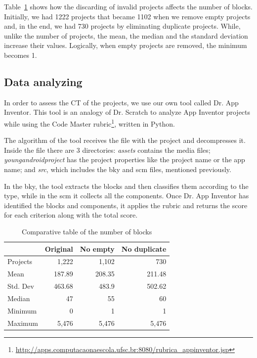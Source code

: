 \documentclass[a4paper]{article}
\begin{document}
Table~\ref{tab:blocks} shows how the discarding of invalid projects affects the number of blocks. Initially, we had 1222 projects that became 1102 when we remove empty projects and, in the end, we had 730 projects by eliminating duplicate projects. While, unlike the number of projects, the mean, the median and the standard deviation increase their values. Logically, when empty projects are removed, the minimum becomes 1.

\subsection{Data analyzing}
In order to assess the CT of the projects, we use our own tool called Dr. App Inventor. This tool is an analogy of Dr. Scratch to analyze App Inventor projects while using the Code Master rubric\footnote{\url{http://apps.computacaonaescola.ufsc.br:8080/rubrica_appinventor.jsp}}, written in Python.

The algorithm of the tool receives the file with the project and decompresses it. Inside the file there are 3 directories: \emph{assets} contains the media files; \emph{youngandroidproject} has the project properties like the project name or the app name; and \emph{src}, which includes the bky and scm files, mentioned previously.

In the bky, the tool extracts the blocks and then classifies them according to the type, while in the scm it collects all the components. Once Dr. App Inventor has identified the blocks and components, it applies the rubric and returns the score for each criterion along with the total score.


\begin{table}
\begin{center}
\caption{Comparative table of the number of blocks}
\bigskip
\label{tab:blocks}
\begin{tabular}{|l|r|r|r|}
\hline
& Original & No empty & No duplicate \\ \hline
Projects & 1,222 & 1,102 & 730\\ \hline
Mean & 187.89 & 208.35 & 211.48\\ \hline
Std. Dev & 463.68 & 483.9 & 502.62 \\ \hline
Median & 47 & 55 & 60\\ \hline
Minimum & 0 & 1 & 1\\ \hline
Maximum & 5,476 & 5,476 & 5,476 \\ \hline
\end{tabular}
\end{center}
\end{table}
\end{document}
